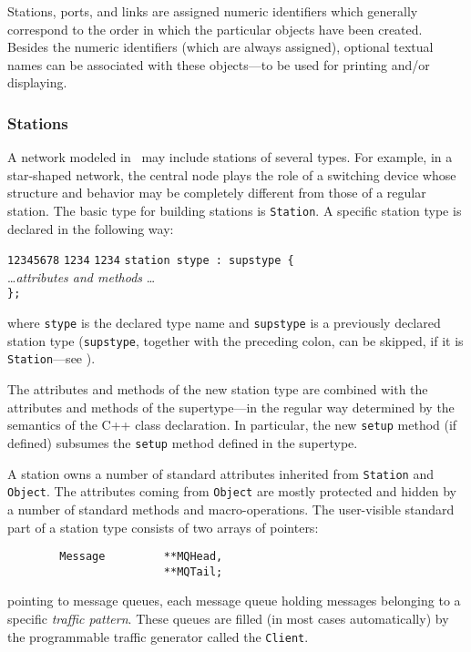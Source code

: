 Stations, ports, and links are assigned numeric identifiers which generally
correspond to the order in which the particular objects have been created.
Besides the numeric identifiers (which are always assigned), optional
textual names can be associated with
these objects---to be used for printing and/or displaying.

\subsubsection{Stations}

A network modeled in \smurph\ may include stations of several types.
For example, in a star-shaped network, the central node plays the
role of a switching device whose structure and behavior may be completely
different from those of a regular station.
The basic type for building stations is {\tt Station}.
A specific station type is declared in the following way:
{\small
\begin{tabbing}
{\tt 12345678} \= {\tt 1234} \= {\tt 1234} \kill
\> {\tt station stype : supstype \{} \\
\> \> \ldots {\em attributes and methods} \ldots \\
\> {\tt \};}
\end{tabbing} }
\noindent
where {\tt stype} is the declared type name and {\tt supstype} is a previously
declared station type ({\tt supstype}, together with the preceding colon,
can be skipped, if it is {\tt Station}---see ).

The attributes and methods of the new station type are combined with the
attributes and methods of the supertype---in the regular way determined by the
semantics of the C++ class declaration.
In particular, the new {\tt setup} method (if defined) subsumes the {\tt setup}
method defined in the supertype.

A station owns a number of standard attributes inherited from
{\tt Station} and {\tt Object}.
The attributes coming from {\tt Object} are mostly protected and hidden by
a number of standard methods and macro-operations.
The user-visible standard part of a station type consists of two arrays of
pointers:
{\small
\begin{verbatim}
        Message         **MQHead,
                        **MQTail;
\end{verbatim} }
\noindent
pointing to message queues, each message
queue holding messages belonging to a specific {\em traffic pattern}.
These queues are filled (in most cases automatically) by the programmable
traffic generator called the {\tt Client}.

